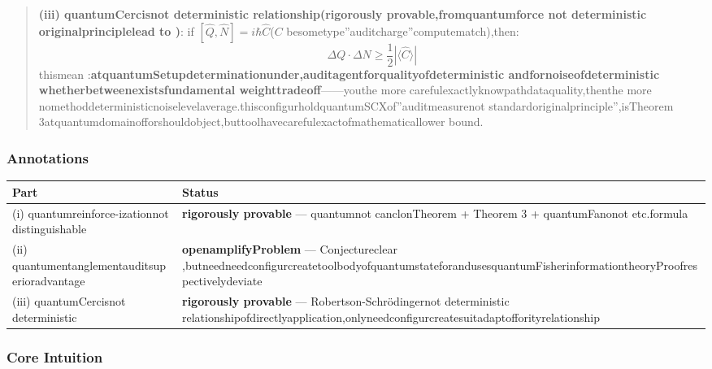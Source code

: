 \documentclass[
  12pt,
]{article}
\begin{document}
\begin{quote}
\textbf{(iii)
quantumCercisnot deterministic relationship(rigorously provable,fromquantumforce not deterministic originalprinciplelead to )}: if
\([\hat{Q}, \hat{N}] = i\hbar \hat{C}\)(\(C\)
besometype''auditcharge''computematch),then:
\[\Delta Q \cdot \Delta N \geq \frac{1}{2} |\langle \hat{C} \rangle|\]
thismean  :\textbf{atquantumSetupdeterminationunder,auditagentforqualityofdeterministic andfornoiseofdeterministic whetherbetweenexistsfundamental weighttradeoff}------youthe more carefulexactlyknowpathdataquality,thenthe more nomethoddeterministicnoiselevelaverage.thisconfigurholdquantumSCXof''auditmeasurenot standardoriginalprinciple'',isTheorem
3atquantumdomainofforshouldobject,buttoolhavecarefulexactofmathematicallower bound.
\end{quote}

\subsubsection{Annotations}\label{ux6807ux6ce8}

\begin{longtable}[]{@{}
  >{\raggedright\arraybackslash}p{}
  >{\raggedright\arraybackslash}p{}@{}}
\toprule\noalign{}
\begin{minipage}[b]{\linewidth}\raggedright
Part
\end{minipage} & \begin{minipage}[b]{\linewidth}\raggedright
Status
\end{minipage} \\
\midrule\noalign{}
\endhead
\bottomrule\noalign{}
\endlastfoot
(i) quantumreinforce-izationnot distinguishable & \textbf{rigorously provable} --- quantumnot canclonTheorem + Theorem
3 + quantumFanonot etc.formula \\
(ii) quantumentanglementauditsuperioradvantage & \textbf{openamplifyProblem} ---
Conjectureclear ,butneedneedconfigurcreatetoolbodyofquantumstateforandusesquantumFisherinformationtheoryProofrespectivelydeviate \\
(iii) quantumCercisnot deterministic  & \textbf{rigorously provable} ---
Robertson-Schrödingernot deterministic relationshipofdirectlyapplication,onlyneedconfigurcreatesuitadaptofforityrelationship \\
\end{longtable}

\subsubsection{Core Intuition}\label{ux6838ux5fc3ux76f4ux89c9}
\end{document}

